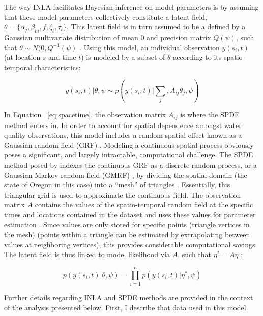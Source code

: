 \documentclass[11pt,a4paper,titlepage]{article}
\begin{document}
The way INLA facilitates Bayesian inference on model parameters is by assuming that these model parameters collectively constitute a latent field, $\theta = \{\alpha_j,\beta_m,f,\zeta_t,\tau_t\}$. This latent field is in turn assumed to be a defined by a Gaussian multivariate distribution of mean 0 and precision matrix $Q(\psi)$, such that $\theta \sim N(0,Q^{-1}(\psi)$ \parencite{blangiardo2013,rue2005,rue2009,cosandey-godin2014}. Using this model, an individual observation $y(s_i,t)$ (at location $s$ and time $t$) is modeled by a subset of $\theta$ according to its spatio-temporal characteristics:

\begin{equation}
y(s_i,t)|\theta,\psi \sim p(y(s_i,t)|\sum_j,A_{ij}\theta_{j},\psi)
\label{eq:spacetime}
\end{equation}

In Equation ~\ref{eq:spacetime}, the observation matrix $A_{ij}$ is where the SPDE method enters in. In order to account for spatial dependence amongst water quality observations, this model includes a random spatial effect known as a Gaussian random field (GRF) \parencite{cosandey-godin2014}. Modeling a continuous spatial process obviously poses a significant, and largely intractable, computational challenge. The SPDE method posed by \textcite{lindgren2011} indexes the continuous GRF as a discrete random process, or a Gaussian Markov random field (GMRF) \parencite{lindgren2013}, by dividing the spatial domain (the state of Oregon in this case) into a “mesh” of triangles \parencite{blangiardo2013}. Essentially, this triangular grid is used to approximate the continuous field. The observation matrix $A$ contains the values of the spatio-temporal random field at the specific times and locations contained in the dataset and uses these values for parameter estimation \parencite{cosandey-godin2014}. Since values are only stored for specific points (triangle vertices in the mesh) (points within a triangle can be estimated by extrapolating between values at neighboring vertices), this provides considerable computational savings. The latent field is thus linked to model likelihood via $A$, such that $\eta^*=A\eta$ \parencite{cosandey-godin2014}:

\begin{equation}
p(y(s_i,t) | \theta,\psi) = \prod_{i=1}^{n} p(y(s_i,t) | \eta^{*},\psi)
\label{eq:spde}
\end{equation}

\noindent
Further details regarding INLA and SPDE methods are provided in the context of the analysis presented below. First, I describe that data used in this model. 
\end{document}
